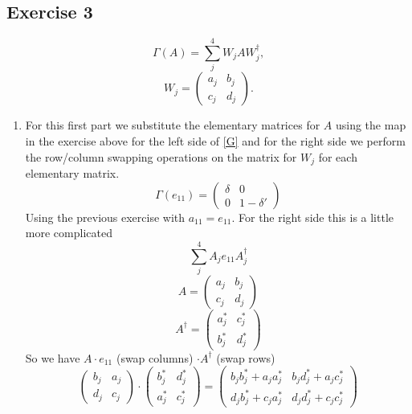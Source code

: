 \documentclass[12pt]{article}
\begin{document}
\begin{enumerate}
    \section{Exercise 3} 
    \begin{equation}\label{G}
        \Gamma(A)=\sum_j^{4}W_j AW_j^\dagger,
        \end{equation}
        \begin{equation}
        W_j=\begin{pmatrix}
        a_j&b_j\\c_j &d_j
        \end{pmatrix}.
        \end{equation}
    \begin{enumerate}
        \item For this first part we substitute the elementary matrices for $A$ using the map in the exercise above for the left side of  \eqref{G} and for the right side we perform the row/column swapping operations on the matrix for $W_j$ for each elementary matrix. 
        $$ \Gamma(e_{11}) = \begin{pmatrix}
            \delta&0\\0 &1-\delta'
            \end{pmatrix} $$
        Using the previous exercise with $a_{11} = e_{11}$. For the right side this is a little more complicated 
        $$ \sum_j^4 A_j e_{11} A_j^{\dagger} $$
        $$ A = \begin{pmatrix}
            a_j&b_j\\c_j &d_j
            \end{pmatrix} $$
        $$ A^{\dagger} =  \begin{pmatrix}
            a_j^*&c_j^*\\b_j^* &d_j^*
            \end{pmatrix} $$
        So we have $A \cdot e_{11}$ (swap columns) $\cdot A^{\dagger}$ (swap rows) 
        $$ \begin{pmatrix}
            b_j&a_j\\d_j &c_j
            \end{pmatrix}
            \cdot  \begin{pmatrix}
                    b_j^*&d_j^*\\a_j^* &c_j^*
                    \end{pmatrix} = \begin{pmatrix}
                        b_j b_j^* + a_j a_j^*&b_j d_j^* + a_j c_j^*\\d_j b_j^* + c_j a_j^*&d_j d_j^* + c_j c_j^* 

\end{pmatrix}$$
\end{enumerate}
\end{enumerate}
\end{document}
